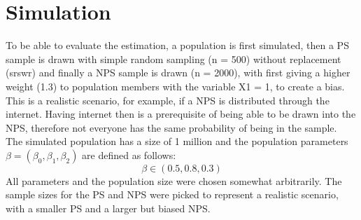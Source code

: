 \documentclass[10.5pt]{article}
\begin{document}
\section{Simulation}
To be able to evaluate the estimation, a population is first simulated, then a PS sample is drawn with simple random sampling (n = 500) without replacement (srswr) and finally a NPS sample is drawn (n = 2000), with first giving a higher weight (1.3) to population members with the variable X1 = 1, to create a bias. This is a realistic scenario, for example, if a NPS is distributed through the internet. Having internet then is a prerequisite of being able to be drawn into the NPS, therefore not everyone has the same probability of being in the sample. \\
The simulated population has a size of 1 million and the population parameters \(\beta = (\beta_0, \beta_1, \beta_2)\) are defined as follows:
\begin{equation}
    \beta \in (0.5, 0.8, 0.3)
\end{equation}
All parameters and the population size were chosen somewhat arbitrarily. The sample sizes for the PS and NPS were picked to represent a realistic scenario, with a smaller PS and a larger but biased NPS.
\end{document}
